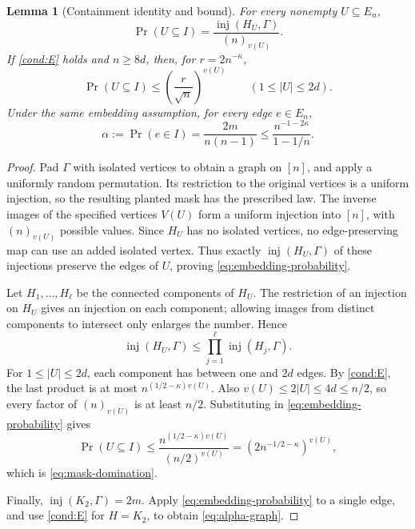 \documentclass[11pt]{article}
\newcommand{\inj}{\operatorname{inj}}
\newcommand{\1}{\mathbf 1}
\newtheorem{lemma}[theorem]{Lemma}
\theoremstyle{definition}
\theoremstyle{remark}
\numberwithin{equation}{section}
\begin{document}
\begin{lemma}[Containment identity and bound]\label{lem:containment}
For every nonempty $U\subseteq E_n$,
\begin{equation}\label{eq:embedding-probability}
 \Pr(U\subseteq I)=\frac{\inj(H_U,\Gamma)}{(n)_{v(U)}}.
\end{equation}
If \eqref{cond:E} holds and $n\ge8d$, then, for $r=2n^{-\kappa}$,
\begin{equation}\label{eq:mask-domination}
 \Pr(U\subseteq I)\le\left(\frac r{\sqrt n}\right)^{v(U)}
 \qquad(1\le|U|\le2d).
\end{equation}
Under the same embedding assumption, for every edge $e\in E_n$,
\begin{equation}\label{eq:alpha-graph}
 \alpha:=\Pr(e\in I)=\frac{2m}{n(n-1)}
 \le\frac{n^{-1-2\kappa}}{1-1/n}.
\end{equation}
\end{lemma}
\begin{proof}
Pad $\Gamma$ with isolated vertices to obtain a graph on $[n]$, and apply a uniformly random permutation. Its restriction to the original vertices is a uniform injection, so the resulting planted mask has the prescribed law. The inverse images of the specified vertices $V(U)$ form a uniform injection into $[n]$, with $(n)_{v(U)}$ possible values. Since $H_U$ has no isolated vertices, no edge-preserving map can use an added isolated vertex. Thus exactly $\inj(H_U,\Gamma)$ of these injections preserve the edges of $U$, proving \eqref{eq:embedding-probability}.

Let $H_1,\ldots,H_\ell$ be the connected components of $H_U$. The restriction of an injection on $H_U$ gives an injection on each component; allowing images from distinct components to intersect only enlarges the number. Hence
\[
 \inj(H_U,\Gamma)\le\prod_{j=1}^{\ell}\inj(H_j,\Gamma).
\]
For $1\le|U|\le2d$, each component has between one and $2d$ edges. By \eqref{cond:E}, the last product is at most $n^{(1/2-\kappa)v(U)}$. Also $v(U)\le2|U|\le4d\le n/2$, so every factor of $(n)_{v(U)}$ is at least $n/2$. Substituting in \eqref{eq:embedding-probability} gives
\[
 \Pr(U\subseteq I)
 \le\frac{n^{(1/2-\kappa)v(U)}}{(n/2)^{v(U)}}
 =\left(2n^{-1/2-\kappa}\right)^{v(U)},
\]
which is \eqref{eq:mask-domination}.

Finally, $\inj(K_2,\Gamma)=2m$. Apply \eqref{eq:embedding-probability} to a single edge, and use \eqref{cond:E} for $H=K_2$, to obtain \eqref{eq:alpha-graph}.
\end{proof}
\end{document}
